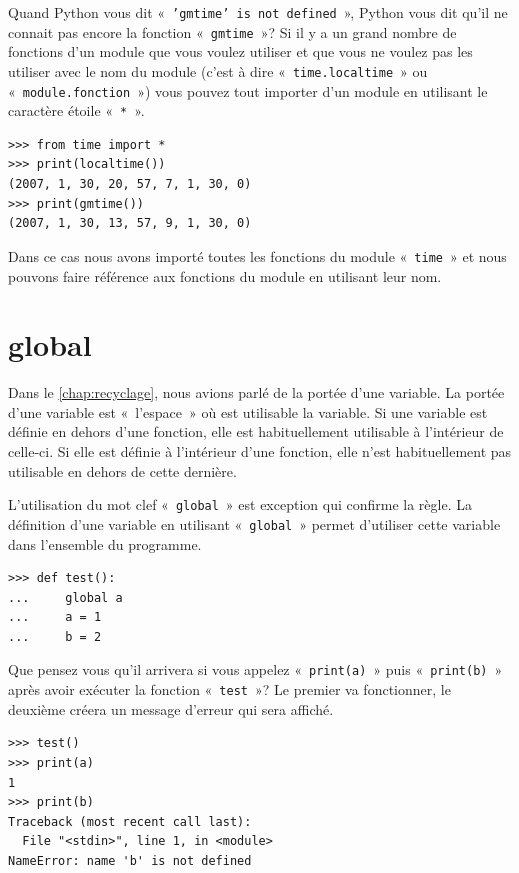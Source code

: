 Quand Python vous dit «~\texttt{'gmtime' is not defined}~», Python vous dit qu'il ne connait pas encore la fonction «~\texttt{gmtime}~»? Si il y a un grand nombre de fonctions d'un module que vous voulez utiliser et que vous ne voulez pas les utiliser avec le nom du module (c'est à dire «~\texttt{time.localtime}~» ou «~\texttt{module.fonction}~») vous pouvez tout importer d'un module en utilisant le caractère étoile «~\texttt{*}~».   


\begin{Verbatim}[frame=single,rulecolor=\color{gray}]
>>> from time import *
>>> print(localtime())
(2007, 1, 30, 20, 57, 7, 1, 30, 0)
>>> print(gmtime())
(2007, 1, 30, 13, 57, 9, 1, 30, 0)
\end{Verbatim}


Dans ce cas nous avons importé toutes les fonctions du module «~\texttt{time}~» et nous pouvons faire référence aux fonctions du module en utilisant leur nom.

\section*{global}

Dans le \autoref{chap:recyclage}, nous avions parlé de la portée d'une variable. La portée d'une variable est «~l'espace~» où est utilisable la variable. Si une variable est définie en dehors d'une fonction, elle est habituellement utilisable à l'intérieur de celle-ci. Si elle est définie à l'intérieur d'une fonction, elle n'est habituellement pas utilisable en dehors de cette dernière. 

L'utilisation du mot clef «~\texttt{global}~» est exception qui confirme la règle. La définition d'une variable en utilisant «~\texttt{global}~» permet d'utiliser cette variable dans l'ensemble du programme.

\begin{listing}
\begin{verbatim}
>>> def test():
...     global a
...     a = 1
...     b = 2
\end{verbatim}
\end{listing}

Que pensez vous qu'il arrivera si vous appelez «~\texttt{print(a)}~» puis «~\texttt{print(b)}~» après avoir exécuter la fonction «~\texttt{test}~»? Le premier va fonctionner, le deuxième créera un message d'erreur qui sera affiché.

\begin{Verbatim}[frame=single,rulecolor=\color{gray}]
>>> test()
>>> print(a)
1
>>> print(b)
Traceback (most recent call last):
  File "<stdin>", line 1, in <module>
NameError: name 'b' is not defined
\end{Verbatim}



